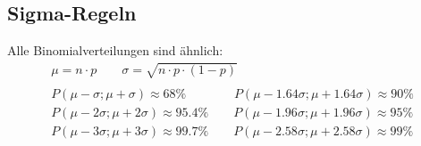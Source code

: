 \subsection{Sigma-Regeln}
Alle Binomialverteilungen sind ähnlich:
\begin{gather*}
  \mu = n \cdot p \qquad \sigma = \sqrt{n \cdot p \cdot (1 - p)} \\\\
  P(\mu - \sigma; \mu + \sigma) \approx 68\% \qquad\quad\;\;\; P(\mu - 1.64\sigma; \mu + 1.64\sigma) \approx 90\% \\
  P(\mu - 2\sigma; \mu + 2\sigma) \approx 95.4\% \qquad P(\mu - 1.96\sigma; \mu + 1.96\sigma) \approx 95\% \\
  P(\mu - 3\sigma; \mu + 3\sigma) \approx 99.7\% \qquad P(\mu - 2.58\sigma; \mu + 2.58\sigma) \approx 99\%
\end{gather*}
